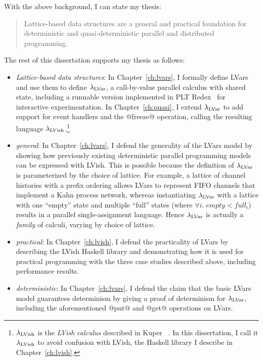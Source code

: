 With the above background, I can state my thesis:
\begin{quote}
  Lattice-based data structures are a general and practical foundation
  for deterministic and quasi-deterministic parallel and distributed
  programming.
\end{quote}
The rest of this dissertation supports my thesis as follows:
\begin{itemize}
  \item \emph{Lattice-based data structures}: In
    Chapter~\ref{ch:lvars}, I formally define LVars and use them to
    define $\lambda_{\textrm{LVar}}$, a call-by-value parallel calculus with
    shared state, including a runnable version implemented in PLT
    Redex~\cite{redex-book} for interactive experimentation.  In
    Chapter~\ref{ch:quasi}, I extend $\lambda_{\textrm{LVar}}$ to add support for
    event handlers and the @freeze@ operation, calling the resulting
    language $\lambda_{\textrm{LVish}}$.\footnote{$\lambda_{\textrm{LVish}}$ is the
      \emph{LVish calculus} described in Kuper
      \etal~\cite{Freeze-paper}.  In this dissertation, I call it
      $\lambda_{\textrm{LVish}}$ to avoid confusion with LVish, the Haskell
      library I describe in Chapter~\ref{ch:lvish}.}

  \item \emph{general}: In Chapter~\ref{ch:lvars}, I defend the
    generality of the LVars model by showing how previously existing
    deterministic parallel programming models can be expressed with
    LVish.  This is possible because the definition of $\lambda_{\textrm{LVar}}$
    is parameterized by the choice of lattice.  For example, a lattice
    of channel histories with a prefix ordering allows LVars to
    represent FIFO channels that implement a Kahn process network,
    whereas instantiating $\lambda_{\textrm{LVar}}$ with a lattice with one
    ``empty'' state and multiple ``full'' states (where $\forall{i}.\;
    \mathit{empty} < \mathit{full_i}$) results in a parallel
    single-assignment language.  Hence $\lambda_{\textrm{LVar}}$ is actually a
    \emph{family} of calculi, varying by choice of lattice.

  \item \emph{practical}: In Chapter~\ref{ch:lvish}, I defend the
    practicality of LVars by describing the LVish Haskell library and
    demonstrating how it is used for practical programming with the
    three case studies described above, including performance results.

  \item \emph{deterministic}: In Chapter~\ref{ch:lvars}, I defend the
    claim that the basic LVars model guarantees determinism by giving
    a proof of determinism for $\lambda_{\textrm{LVar}}$, including the
    aforementioned @put@ and @get@ operations on LVars.


\end{itemize}
